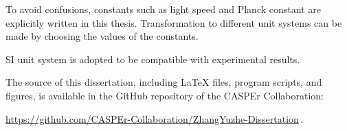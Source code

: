 
To avoid confusions, constants such as light speed and Planck constant are explicitly written in this thesis.
Transformation to different unit systems can be made by choosing the values of the constants.

SI unit system is adopted to be compatible with experimental results.

The source of this dissertation, including \LaTeX{} files, program scripts, and figures, is available in the GitHub repository of the CASPEr Collaboration:
\begin{center}
    \url{https://github.com/CASPEr-Collaboration/ZhangYuzhe-Dissertation}\,.
\end{center}
